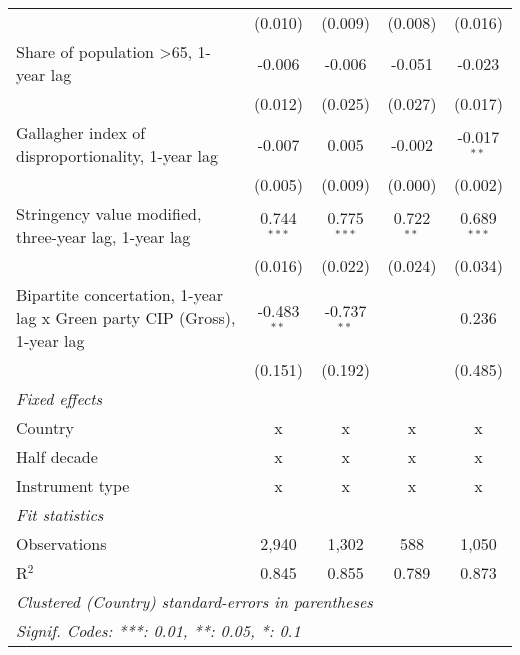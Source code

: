 \begin{table}[htbp]
\begin{tabular}{lcccc}
                                                                               & (0.010)       & (0.009)         & (0.008)         & (0.016)\\   
      Share of population >65, 1-year lag                                      & -0.006        & -0.006          & -0.051          & -0.023\\   
                                                                               & (0.012)       & (0.025)         & (0.027)         & (0.017)\\   
      Gallagher index of disproportionality, 1-year lag                        & -0.007        & 0.005           & -0.002          & -0.017$^{**}$\\   
                                                                               & (0.005)       & (0.009)         & (0.000)         & (0.002)\\   
      Stringency value modified, three-year lag, 1-year lag                    & 0.744$^{***}$ & 0.775$^{***}$   & 0.722$^{**}$    & 0.689$^{***}$\\   
                                                                               & (0.016)       & (0.022)         & (0.024)         & (0.034)\\   
      Bipartite concertation, 1-year lag x Green party CIP (Gross), 1-year lag & -0.483$^{**}$ & -0.737$^{**}$   &                 & 0.236\\   
                                                                               & (0.151)       & (0.192)         &                 & (0.485)\\   
      \emph{Fixed effects}\\
      Country                                                                  & x             & x               & x               & x\\  
      Half decade                                                              & x             & x               & x               & x\\  
      Instrument type                                                          & x             & x               & x               & x\\  
      \midrule \emph{Fit statistics}\\
      Observations                                                             & 2,940         & 1,302           & 588             & 1,050\\  
      R$^2$                                                                    & 0.845         & 0.855           & 0.789           & 0.873\\  
      \midrule
      \multicolumn{5}{l}{\emph{Clustered (Country) standard-errors in parentheses}}\\
      \multicolumn{5}{l}{\emph{Signif. Codes: ***: 0.01, **: 0.05, *: 0.1}}\\
   \end{tabular}
\end{table}


